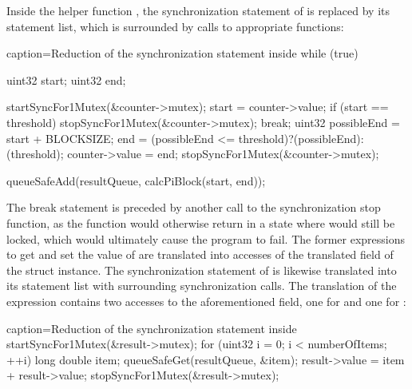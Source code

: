 Inside the helper function , the synchronization statement of  is replaced by its statement list, which is surrounded by calls to appropriate functions:
\begin{ccode}{caption=Reduction of the synchronization statement inside }
while (true) {
  uint32 start; 
  uint32 end;
  
  startSyncFor1Mutex(&counter->mutex); 
  { 
    start = counter->value; 
    if (start == threshold) { 
      stopSyncFor1Mutex(&counter->mutex); 
      break; 
    }
    uint32 possibleEnd = start + BLOCKSIZE; 
    end = (possibleEnd <= threshold)?(possibleEnd):(threshold); 
    counter->value = end; 
  } 
  stopSyncFor1Mutex(&counter->mutex);
  
  queueSafeAdd(resultQueue, calcPiBlock(start, end));
}
\end{ccode}
The break statement is preceded by another call to the synchronization stop function, as the function would otherwise return in a state where  would still be locked, which would ultimately cause the program to fail. The former expressions to get and set the value of  are translated into accesses of the translated  field of the  struct instance. The synchronization statement of  is likewise translated into its statement list with surrounding synchronization calls. The translation of the expression  contains two accesses to the aforementioned  field, one for  and one for :
\begin{ccode}{caption=Reduction of the synchronization statement inside }
startSyncFor1Mutex(&result->mutex); 
{ 
  for (uint32 i = 0; i < numberOfItems; ++i) { 
    long double item; 
    queueSafeGet(resultQueue, &item); 
    result->value = item + result->value; 
  }
} 
stopSyncFor1Mutex(&result->mutex);
\end{ccode}
